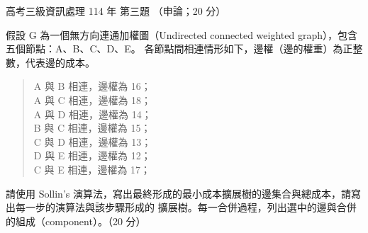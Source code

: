 \begin{pastexam}[label={px:gk3-114-ds-03}]{高考三級資訊處理 114 年 第三題}
（申論；20 分）

假設 G 為一個無方向連通加權圖（Undirected connected weighted graph），包含五個節點：A、B、C、D、E。
各節點間相連情形如下，邊權（邊的權重）為正整數，代表邊的成本。
\begin{quote}
A 與 B 相連，邊權為 16；\\
A 與 C 相連，邊權為 18；\\
A 與 D 相連，邊權為 14；\\
B 與 C 相連，邊權為 15；\\
C 與 D 相連，邊權為 13；\\
D 與 E 相連，邊權為 12；\\
C 與 E 相連，邊權為 17；
\end{quote}
請使用 Sollin's 演算法，寫出最終形成的最小成本擴展樹的邊集合與總成本，請寫出每一步的演算法與該步驟形成的
擴展樹。每一合併過程，列出選中的邊與合併的組成（component）。（20 分）
\end{pastexam}

